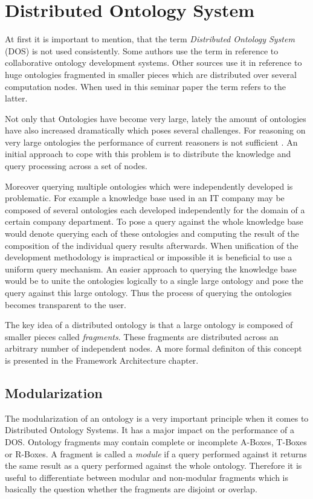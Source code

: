\section{Distributed Ontology System}
At first it is important to mention, that the term \emph{Distributed Ontology System}
(DOS) is not used consistently. Some authors use the term in reference to collaborative ontology
development systems. Other sources use
it in reference to huge ontologies fragmented in smaller pieces
which are distributed over several computation nodes. When used in this seminar
paper the term refers to the latter.

Not only that Ontologies have become very large, lately the amount of ontologies
have also increased dramatically which poses several challenges. 
For reasoning on very large ontologies the performance of current reasoners is
not sufficient \cite{chen09}. An initial approach to cope with this problem is to distribute
the knowledge and query processing across a set of nodes.

Moreover querying multiple ontologies which were independently developed is problematic.
For example a knowledge base used in an IT company may be composed of
several ontologies each developed independently for the domain of a certain company department.
To pose a query against the whole knowledge base would denote querying each of
these ontologies and computing the result of the composition of the individual query
results afterwards.
When unification of the development methodology is impractical or impossible it
is beneficial to use a uniform query mechanism.
An easier approach to querying the knowledge base would be to unite the ontologies logically
to a single large ontology and pose the query against this
large ontology. Thus the process of querying the ontologies becomes transparent to the user.

The key idea of a distributed ontology is that a large ontology is composed of smaller
pieces called \emph{fragments}. These fragments are distributed across an
arbitrary number of independent nodes. A more formal definiton of this
concept is presented in the Framework Architecture chapter.

\subsection{Modularization}
The modularization of an ontology is a very important principle when
it comes to Distributed Ontology Systems. It has a major impact on
the performance of a DOS. Ontology fragments may contain complete or incomplete
A-Boxes, T-Boxes or R-Boxes.
A fragment is called a \emph{module} if a query performed against
it returns the same result as a query performed against the whole ontology.
Therefore it is useful to differentiate between modular and non-modular
fragments which is basically the question whether the fragments are disjoint
or overlap.


